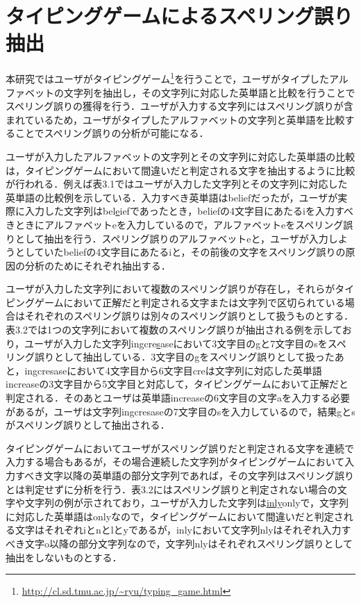 \chapter{タイピングゲームによるスペリング誤り抽出}
本研究ではユーザがタイピングゲーム\footnote{\url{http://cl.sd.tmu.ac.jp/~ryu/typing_game.html}}を行うことで，ユーザがタイプしたアルファベットの文字列を抽出し，その文字列に対応した英単語と比較を行うことでスペリング誤りの獲得を行う．ユーザが入力する文字列にはスペリング誤りが含まれているため，ユーザがタイプしたアルファベットの文字列と英単語を比較することでスペリング誤りの分析が可能になる．

ユーザが入力したアルファベットの文字列とその文字列に対応した英単語の比較は，タイピングゲームにおいて間違いだと判定される文字を抽出するように比較が行われる．例えば表3.1ではユーザが入力した文字列とその文字列に対応した英単語の比較例を示している．入力すべき英単語はbeliefだったが，ユーザが実際に入力した文字列はbel\underline{e}iefであったとき，beliefの4文字目にあたるiを入力すべきときにアルファベットeを入力しているので，アルファベットeをスペリング誤りとして抽出を行う．スペリング誤りのアルファベットeと，ユーザが入力しようとしていたbeliefの4文字目にあたるiと，その前後の文字をスペリング誤りの原因の分析のためにそれぞれ抽出する．

ユーザが入力した文字列において複数のスペリング誤りが存在し，それらがタイピングゲームにおいて正解だと判定される文字または文字列で区切られている場合はそれぞれのスペリング誤りは別々のスペリング誤りとして扱うものとする．表3.2では1つの文字列において複数のスペリング誤りが抽出される例を示しており，ユーザが入力した文字列in\underline{g}cre\underline{s}aseにおいて3文字目のgと7文字目のsをスペリング誤りとして抽出している．3文字目のgをスペリング誤りとして扱ったあと，ingcresaseにおいて4文字目から6文字目creは文字列に対応した英単語increaseの3文字目から5文字目と対応して，タイピングゲームにおいて正解だと判定される．そのあとユーザは英単語increaseの6文字目の文字aを入力する必要があるが，ユーザは文字列ingcresaseの7文字目のsを入力しているので，結果gとsがスペリング誤りとして抽出される．

タイピングゲームにおいてユーザがスペリング誤りだと判定される文字を連続で入力する場合もあるが，その場合連続した文字列がタイピングゲームにおいて入力すべき文字以降の英単語の部分文字列であれば，その文字列はスペリング誤りとは判定せずに分析を行う．表3.2にはスペリング誤りと判定されない場合の文字や文字列の例が示されており，ユーザが入力した文字列は\underline{inly}onlyで，文字列に対応した英単語はonlyなので，タイピングゲームにおいて間違いだと判定される文字はそれぞれiとnとlとyであるが，inlyにおいて文字列nlyはそれぞれ入力すべき文字o以降の部分文字列なので，文字列nlyはそれぞれスペリング誤りとして抽出をしないものとする．

